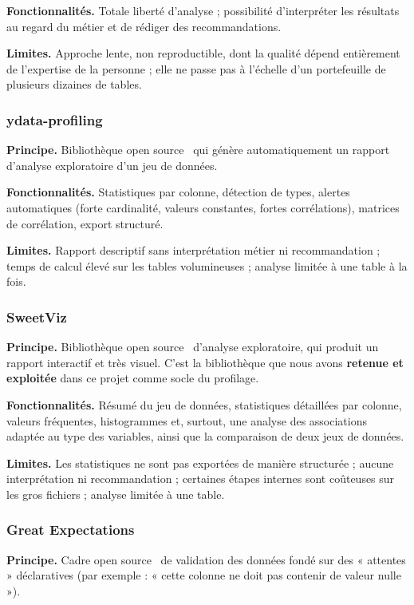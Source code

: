 \textbf{Fonctionnalités.} Totale liberté d'analyse ; possibilité d'interpréter les résultats au regard du métier et de rédiger des recommandations.

\textbf{Limites.} Approche lente, non reproductible, dont la qualité dépend entièrement de l'expertise de la personne ; elle ne passe pas à l'échelle d'un portefeuille de plusieurs dizaines de tables.

\subsubsection{ydata-profiling}

\textbf{Principe.} Bibliothèque open source~\cite{ydata} qui génère automatiquement un rapport d'analyse exploratoire d'un jeu de données.

\textbf{Fonctionnalités.} Statistiques par colonne, détection de types, alertes automatiques (forte cardinalité, valeurs constantes, fortes corrélations), matrices de corrélation, export structuré.

\textbf{Limites.} Rapport descriptif sans interprétation métier ni recommandation ; temps de calcul élevé sur les tables volumineuses ; analyse limitée à une table à la fois.

\subsubsection{SweetViz}

\textbf{Principe.} Bibliothèque open source~\cite{sweetviz} d'analyse exploratoire, qui produit un rapport interactif et très visuel. C'est la bibliothèque que nous avons \textbf{retenue et exploitée} dans ce projet comme socle du profilage.

\textbf{Fonctionnalités.} Résumé du jeu de données, statistiques détaillées par colonne, valeurs fréquentes, histogrammes et, surtout, une analyse des associations adaptée au type des variables, ainsi que la comparaison de deux jeux de données.

\textbf{Limites.} Les statistiques ne sont pas exportées de manière structurée ; aucune interprétation ni recommandation ; certaines étapes internes sont coûteuses sur les gros fichiers ; analyse limitée à une table.

\subsubsection{Great Expectations}

\textbf{Principe.} Cadre open source~\cite{gx} de validation des données fondé sur des « attentes » déclaratives (par exemple : « cette colonne ne doit pas contenir de valeur nulle »).

